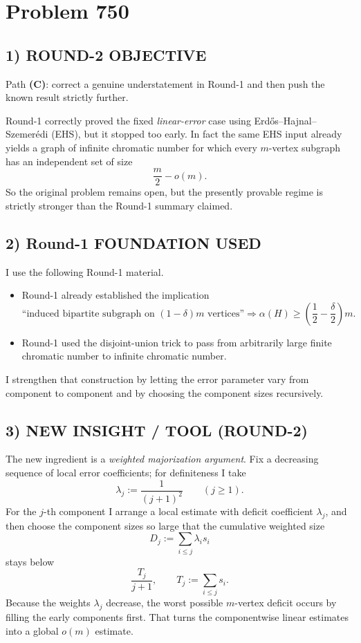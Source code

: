 \section{Problem 750}

\subsection*{1) ROUND-2 OBJECTIVE}

Path \textbf{(C)}: correct a genuine understatement in Round-1 and then push the known result strictly further.

Round-1 correctly proved the fixed \emph{linear-error} case using Erd\H{o}s--Hajnal--Szemer\'edi (EHS), but it stopped too early. In fact the same EHS input already yields a graph of infinite chromatic number for which every $m$-vertex subgraph has an independent set of size
\[
\frac{m}{2}-o(m).
\]
So the original problem remains open, but the presently provable regime is strictly stronger than the Round-1 summary claimed.

\subsection*{2) Round-1 FOUNDATION USED}

I use the following Round-1 material.

\begin{itemize}
\item Round-1 already established the implication
\[
\text{``induced bipartite subgraph on }(1-\delta)m\text{ vertices''}
\Longrightarrow
\alpha(H)\geq \left(\frac12-\frac\delta2\right)m.
\]
\item Round-1 used the disjoint-union trick to pass from arbitrarily large finite chromatic number to infinite chromatic number.
\end{itemize}

I strengthen that construction by letting the error parameter vary from component to component and by choosing the component sizes recursively.

\subsection*{3) NEW INSIGHT / TOOL (ROUND-2)}

The new ingredient is a \emph{weighted majorization argument}. Fix a decreasing sequence of local error coefficients; for definiteness I take
\[
\lambda_j:=\frac{1}{(j+1)^2}\qquad (j\ge 1).
\]
For the $j$-th component I arrange a local estimate with deficit coefficient $\lambda_j$, and then choose the component sizes so large that the cumulative weighted size
\[
D_j:=\sum_{i\le j}\lambda_i s_i
\]
stays below
\[
\frac{T_j}{j+1},\qquad T_j:=\sum_{i\le j}s_i.
\]
Because the weights $\lambda_j$ decrease, the worst possible $m$-vertex deficit occurs by filling the early components first. That turns the componentwise linear estimates into a global $o(m)$ estimate.

